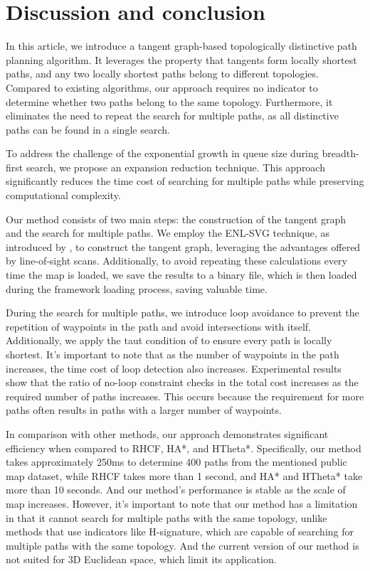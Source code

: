 \documentclass[letterpaper, 10 pt, journal, twoside]{IEEEtran}
\begin{document}
\section{Discussion and conclusion}
\label{Conclusion}

In this article, we introduce a tangent graph-based topologically distinctive path planning algorithm. It leverages the property that tangents form locally shortest paths, and any two locally shortest paths belong to different topologies. Compared to existing algorithms, our approach requires no indicator to determine whether two paths belong to the same topology. Furthermore, it eliminates the need to repeat the search for multiple paths, as all distinctive paths can be found in a single search.

To address the challenge of the exponential growth in queue size during breadth-first search, we propose an expansion reduction technique. This approach significantly reduces the time cost of searching for multiple paths while preserving computational complexity.

Our method consists of two main steps: the construction of the tangent graph and the search for multiple paths. We employ the ENL-SVG technique, as introduced by \cite{oh2017edge}, to construct the tangent graph, leveraging the advantages offered by line-of-sight scans. Additionally, to avoid repeating these calculations every time the map is loaded, we save the results to a binary file, which is then loaded during the framework loading process, saving valuable time.

During the search for multiple paths, we introduce loop avoidance to prevent the repetition of waypoints in the path and avoid intersections with itself. Additionally, we apply the taut condition of \cite{oh2017edge} to ensure every path is locally shortest. It's important to note that as the number of waypoints in the path increases, the time cost of loop detection also increases. Experimental results show that the ratio of no-loop constraint checks in the total cost increases as the required number of paths increases. This occurs because the requirement for more paths often results in paths with a larger number of waypoints.

In comparison with other methods, our approach demonstrates significant efficiency when compared to RHCF, HA*, and HTheta*. Specifically, our method takes approximately 250ms to determine 400 paths from the mentioned public map dataset, while RHCF takes more than 1 second, and HA* and HTheta* take more than 10 seconds. And our method's performance is stable as the scale of map increases. However, it's important to note that our method has a limitation in that it cannot search for multiple paths with the same topology, unlike methods that use indicators like H-signature, which are capable of searching for multiple paths with the same topology. And the current version of our method is not suited for 3D Euclidean space, which limit its application.
\end{document}
